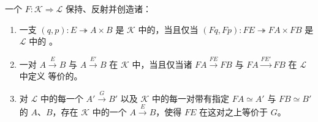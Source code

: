 \begin{proposition}\label{prop:biequivalence-preserves-modules}
一个\trCosmologicalBiequivalence{}
$F\colon\mathcal{K}\Rightarrow\mathcal{L}$ 保持、反射并创造诸\trModule：
\begin{enumerate}[label=(\roman*)]
\item 一支\trIsofibration{} $(q,p)\colon E\twoheadrightarrow A\times B$ 是
$\mathcal{K}$ 中的\trModule，当且仅当
$(Fq,Fp)\colon FE\twoheadrightarrow FA\times FB$ 是 $\mathcal{L}$ 中的%
\trModule。
\item 一对\trModule{} $A\xrightarrow{E}B$ 与 $A\xrightarrow{E'}B$ 在
$\mathcal{K}$ 中\trEquivalence，当且仅当诸\trModule{}
$FA\xrightarrow{FE}FB$ 与 $FA\xrightarrow{FE'}FB$ 在 $\mathcal{L}$ 中定义
等价的\trModule。
\item 对 $\mathcal{L}$ 中的每一个\trModule{} $A'\xrightarrow{G}B'$ 以及
$\mathcal{K}$ 中的每一对带有指定\trEquivalence{} $FA\simeq A'$ 与
$FB\simeq B'$ 的\trInfinityCategory{} $A$、$B$，存在 $\mathcal{K}$ 中的一个%
\trModule{} $A\xrightarrow{E}B$，使得 $FE$ 在这对\trEquivalence{}之上等价于
$G$。
\end{enumerate}
\end{proposition}

